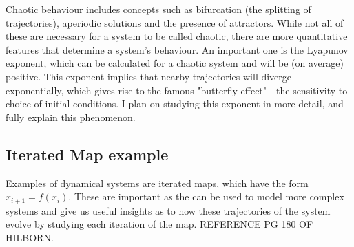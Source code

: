 \documentclass[12pt,a4paper]{amsart}
\begin{document}

Chaotic behaviour includes concepts such as bifurcation (the splitting of trajectories), aperiodic solutions and the presence of attractors. While not all of these are necessary for a system to be called chaotic, there are more quantitative features that determine a system's behaviour. An important one is the Lyapunov exponent, which can be calculated for a chaotic system and will be (on average) positive. This exponent implies that nearby trajectories will diverge exponentially, which gives rise to the famous "butterfly effect" - the sensitivity to choice of initial conditions. I plan on studying this exponent in more detail, and fully explain this phenomenon.

\subsection{Iterated Map example}

Examples of dynamical systems are iterated maps, which have the form $x_{i+1} = f(x_{i})$. These are important as the can be used to model more complex systems and give us useful insights as to how these trajectories of the system evolve by studying each iteration of the map. REFERENCE PG 180 OF HILBORN.
\end{document}
